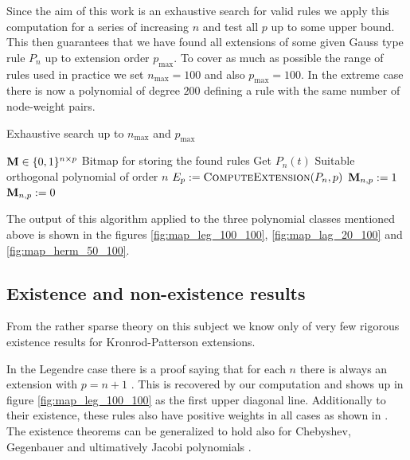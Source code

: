 \documentclass[a4paper,10pt]{article}
\begin{document}
Since the aim of this work is an exhaustive search for valid rules we apply
this computation for a series of increasing $n$ and test all $p$ up to some
upper bound. This then guarantees that we have found all extensions of
some given Gauss type rule $P_n$ up to extension order $p_{\textrm{max}}$.
To cover as much as possible the range of rules used in practice we set
$n_{\mathrm{max}} = 100$ and also $p_{\textrm{max}} = 100$. In the extreme case
there is now a polynomial of degree $200$ defining a rule with the same number
of node-weight pairs.

\begin{algorithm}
  \caption{Exhaustive search up to $n_{\textrm{max}}$ and $p_{\textrm{max}}$}
  \label{alg:exhaustive_search}
  \begin{algorithmic}
      \State $\mathbf{M} \in \{0,1\}^{n \times p}$
      \Comment Bitmap for storing the found rules
        \State Get $P_n(t)$
        \Comment Suitable orthogonal polynomial of order $n$
          \State $E_p := \textsc{ComputeExtension}(P_n, p)$
            \State $\mathbf{M}_{n,p} := 1$
          \Else
            \State $\mathbf{M}_{n,p} := 0$
          \EndIf
        \EndFor
      \EndFor
    \EndProcedure
  \end{algorithmic}
\end{algorithm}

The output of this algorithm applied to the three polynomial classes mentioned
above is shown in the figures \ref{fig:map_leg_100_100}, \ref{fig:map_lag_20_100}
and \ref{fig:map_herm_50_100}.




\subsection{Existence and non-existence results}

From the rather sparse theory on this subject we know only of very few rigorous
existence results for Kronrod-Patterson extensions.

In the Legendre case there is a proof saying that for each $n$ there is
always an extension with $p = n + 1$ \cite{szegoe}. This is recovered by our
computation and shows up in figure \ref{fig:map_leg_100_100} as the first upper
diagonal line. Additionally to their existence, these rules also have positive
weights in all cases as shown in \cite{monegato1978}. The existence theorems can
be generalized to hold also for Chebyshev, Gegenbauer and ultimatively Jacobi
polynomials \cite{gautschi-notaris, gautschi, notaris1990, monegato1978_2}.
\end{document}
